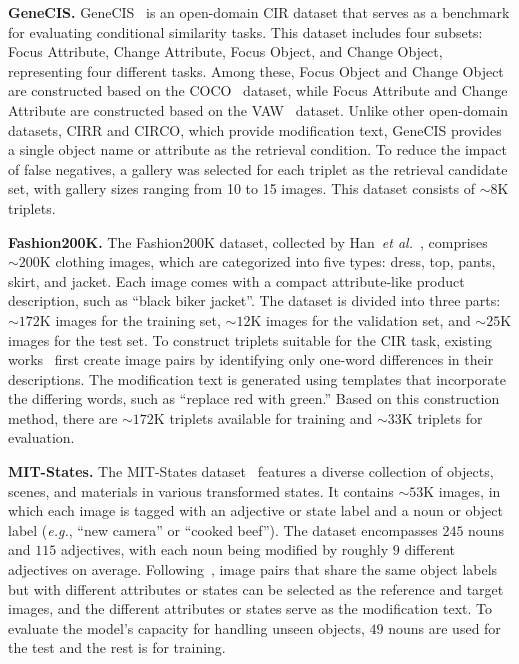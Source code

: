 \textbf{GeneCIS.} 
GeneCIS~\cite{genecis} is an open-domain CIR dataset that serves as a benchmark for evaluating conditional similarity tasks. This dataset includes four subsets: Focus Attribute, Change Attribute, Focus Object, and Change Object, representing four different tasks. Among these, Focus Object and Change Object are constructed based on the COCO~\cite{lin2014coco} dataset, while Focus Attribute and Change Attribute are constructed based on the VAW~\cite{pham2021learning} dataset. Unlike other open-domain datasets, CIRR and CIRCO, which provide modification text, GeneCIS provides a single object name or attribute as the retrieval condition. To reduce the impact of false negatives, a gallery was selected for each triplet as the retrieval candidate set, with gallery sizes ranging from 10 to 15 images. This dataset consists of $\sim8$K triplets.

\textbf{Fashion200K.} The Fashion200K dataset, collected by Han~\textit{et al.}~\cite{Han2017fashion}, comprises  $\sim200$K clothing images, which are categorized into five types: dress, top, pants, skirt, and jacket. Each image comes with a compact attribute-like product description, such as ``black biker jacket''. The dataset is divided into three parts: $\sim172$K images for the training set, $\sim12$K images for the validation set, and $\sim25$K images for the test set. To construct triplets suitable for the CIR task, existing works~\cite{vo2019tirg, wen2021clvcnet} first create image pairs by identifying only one-word differences in their descriptions. The modification text is generated using templates that incorporate the differing words, such as ``replace red with green.'' Based on this construction method, there are $\sim172$K triplets available for training and $\sim33$K triplets for evaluation. 

\textbf{MIT-States.} The MIT-States dataset~\cite{Phi2015discover} features a diverse collection of objects, scenes, and materials in various transformed states. It contains $\sim53$K images, in which each image is tagged with an adjective or state label and a noun or object label (\textit{e.g.}, ``new camera'' or ``cooked beef''). The dataset encompasses $245$ nouns and $115$ adjectives, with each noun being modified by roughly $9$ different adjectives on average. Following~\cite{vo2019tirg}, image pairs that share the same object labels but with different attributes or states can be selected as the reference and target images, and the different attributes or states serve as the modification text. To evaluate the model's capacity for handling unseen objects, $49$ nouns are used for the test and the rest is for training.

